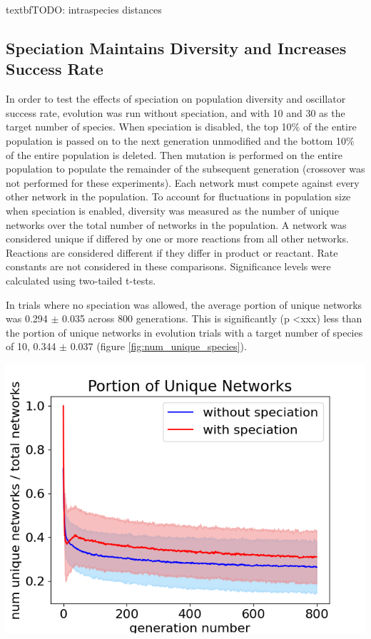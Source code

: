 \documentclass[12pt]{report}
\begin{document}
textbf{TODO: intraspecies distances}

\subsection{Speciation Maintains Diversity and Increases Success Rate}
\label{section:speciation}
In order to test the effects of speciation on population diversity and oscillator success rate, evolution was run without speciation, and with 10 and 30 as the target number of species. When speciation is disabled, the top 10\% of the entire population is passed on to the next generation unmodified and the bottom 10\% of the entire population is deleted. Then mutation is performed on the entire population to populate the remainder of the subsequent generation (crossover was not performed for these experiments). Each network must compete against every other network in the population. To account for fluctuations in population size when speciation is enabled, diversity was measured as the number of unique networks over the total number of networks in the population. A network was considered unique if differed by one or more reactions from all other networks. Reactions are considered different if they differ in product or reactant. Rate constants are not considered in these comparisons. Significance levels were calculated using two-tailed t-tests. 


In trials where no speciation was allowed, the average portion of unique networks was 0.294 $\pm$ 0.035 across 800 generations. This is significantly (p \textless xxx) less than the portion of unique networks in evolution trials with a target number of species of 10, 0.344 $\pm$ 0.037 (figure \ref{fig:num_unique_species}).

\begin{center}
    \includegraphics[width=18cm]{images/num_unique_networks.png}
    \label{fig:num_unique_species}
\end{center}
\end{document}
